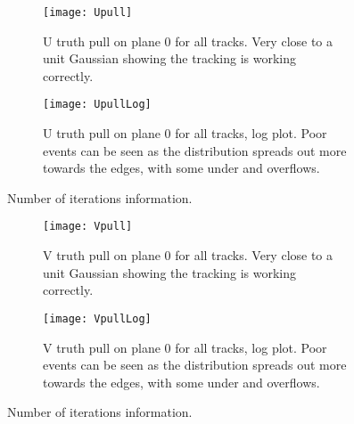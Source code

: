 \begin{figure}
    \centering
    \begin{subfigure}[]{0.8\textwidth}
        \centering
        \texttt{[image: Upull]} 
        \caption{U truth pull on plane 0 for all tracks. Very close to a unit Gaussian showing the tracking is working correctly.}
    \end{subfigure}
    
    \begin{subfigure}[]{0.8\textwidth}
        \centering
        \texttt{[image: UpullLog]} 
        \caption{U truth pull on plane 0 for all tracks, log plot. Poor events can be seen as the distribution spreads out more towards the edges, with some under and overflows.}
    \end{subfigure}

    \caption{Number of iterations information.}
\end{figure}

\begin{figure}
    \centering
    \begin{subfigure}[]{0.8\textwidth}
        \centering
        \texttt{[image: Vpull]} 
        \caption{V truth pull on plane 0 for all tracks. Very close to a unit Gaussian showing the tracking is working correctly.}
    \end{subfigure}
    
    \begin{subfigure}[]{0.8\textwidth}
        \centering
        \texttt{[image: VpullLog]} 
        \caption{V truth pull on plane 0 for all tracks, log plot. Poor events can be seen as the distribution spreads out more towards the edges, with some under and overflows.}
    \end{subfigure}

    \caption{Number of iterations information.}
\end{figure}



